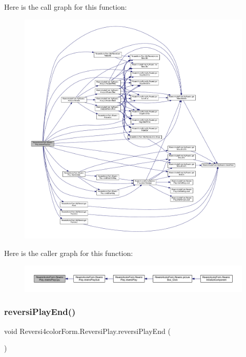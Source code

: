 Here is the call graph for this function\+:
\nopagebreak
\begin{figure}[H]
\begin{center}
\leavevmode
\includegraphics[width=350pt]{class_reversi4color_form_1_1_reversi_play_a0fdeec03a631927d44ed2602808b8619_cgraph}
\end{center}
\end{figure}
Here is the caller graph for this function\+:
\nopagebreak
\begin{figure}[H]
\begin{center}
\leavevmode
\includegraphics[width=350pt]{class_reversi4color_form_1_1_reversi_play_a0fdeec03a631927d44ed2602808b8619_icgraph}
\end{center}
\end{figure}
\mbox{\label{class_reversi4color_form_1_1_reversi_play_a79053272ed2b985de79154b105c46c15}} 
\subsubsection{\texorpdfstring{reversi\+Play\+End()}{reversiPlayEnd()}}
{\footnotesize\ttfamily void Reversi4color\+Form.\+Reversi\+Play.\+reversi\+Play\+End (\begin{DoxyParamCaption}{ }\end{DoxyParamCaption})}



